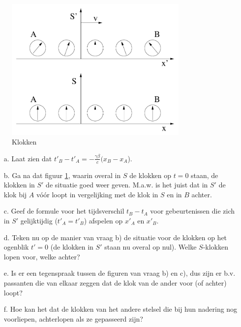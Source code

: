 \begin{figure}[ht]
\centering
\includegraphics[width=0.8\textwidth]{oefeningen.pictures/clocks}
\caption{Klokken}
\label{f:lorentz2-2}
\end{figure}

\begin{itemize}
\item [a.]
Laat zien dat $t'_{B}-t'_{A} = -\frac{\gamma \beta}{c}(x_{B}-x_{A}$).
\item [b.]
Ga na dat figuur \ref{f:lorentz2-2}, waarin overal in 
$S$  de klokken op $t = 0$ staan, de 
klokken in $S'$ de situatie goed weer geven.
M.a.w. is het juist dat in $S'$ de klok bij $A$ v\'{o}\'{o}r loopt 
in vergelijking met de klok in $S$ en 
in $B$ achter.
\item [c.]
Geef  de  formule  voor  het  tijdsverschil $t_{B}-t_{A}$ voor 
gebeurtenissen   die   zich   in $S'$ gelijktijdig 
($t'_{A}=t'_{B}$) afspelen op $x'_{A}$ en $x'_{B}$.
\item [d.]
Teken  nu  op de manier van vraag b) de situatie voor de klokken op het 
ogenblik $t' = 0$ (de klokken in $S'$ staan nu overal op nul). 
Welke $S$-klokken lopen voor, welke achter?
\item [e.]
 Is  er  een tegenspraak tussen de figuren van vraag b) en c), 
dus zijn er b.v. passanten die van elkaar zeggen dat de klok van de 
ander voor (of achter) loopt?
\item [f.]
  Hoe  kan het dat de klokken van het andere stelsel die bij hun nadering 
nog voorliepen, achterlopen als ze gepasseerd zijn?
\end{itemize}

